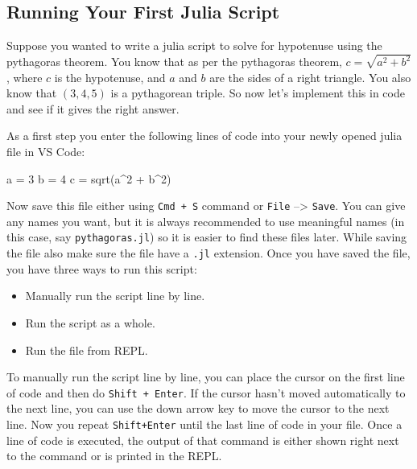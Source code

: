 \documentclass[
  letterpaper,
]{book}
\newenvironment{Shaded}{\begin{snugshade}}{\end{snugshade}}
\newcommand{\FloatTok}[1]{\textcolor[rgb]{0.68,0.00,0.00}{#1}}
\newcommand{\FunctionTok}[1]{\textcolor[rgb]{0.28,0.35,0.67}{#1}}
\newcommand{\NormalTok}[1]{\textcolor[rgb]{0.00,0.23,0.31}{#1}}
\newcommand{\OperatorTok}[1]{\textcolor[rgb]{0.37,0.37,0.37}{#1}}
\providecommand{\tightlist}{%
  \setlength{\itemsep}{0pt}\setlength{\parskip}{0pt}}\usepackage{longtable,booktabs,array}
\begin{document}
\hypertarget{sec-julia-script}{%
\subsection{Running Your First Julia Script}\label{sec-julia-script}}

Suppose you wanted to write a julia script to solve for hypotenuse using
the pythagoras theorem. You know that as per the pythagoras theorem,
\(c = \sqrt{a^2 + b^2}\), where \(c\) is the hypotenuse, and \(a\) and
\(b\) are the sides of a right triangle. You also know that \((3,4,5)\)
is a pythagorean triple. So now let's implement this in code and see if
it gives the right answer.

As a first step you enter the following lines of code into your newly
opened julia file in VS Code:

\begin{Shaded}
\begin{Highlighting}[]
\NormalTok{a }\OperatorTok{=} \FloatTok{3}
\NormalTok{b }\OperatorTok{=} \FloatTok{4}
\NormalTok{c }\OperatorTok{=} \FunctionTok{sqrt}\NormalTok{(a}\OperatorTok{\^{}}\FloatTok{2} \OperatorTok{+}\NormalTok{ b}\OperatorTok{\^{}}\FloatTok{2}\NormalTok{)}
\end{Highlighting}
\end{Shaded}

Now save this file either using \texttt{Cmd\ +\ S} command or
\texttt{File} --\textgreater{} \texttt{Save}. You can give any names you
want, but it is always recommended to use meaningful names (in this
case, say \texttt{pythagoras.jl}) so it is easier to find these files
later. While saving the file also make sure the file have a \texttt{.jl}
extension. Once you have saved the file, you have three ways to run this
script:

\begin{itemize}
\tightlist
\item
  Manually run the script line by line.
\item
  Run the script as a whole.
\item
  Run the file from REPL.
\end{itemize}

To manually run the script line by line, you can place the cursor on the
first line of code and then do \texttt{Shift\ +\ Enter}. If the cursor
hasn't moved automatically to the next line, you can use the down arrow
key to move the cursor to the next line. Now you repeat
\texttt{Shift+Enter} until the last line of code in your file. Once a
line of code is executed, the output of that command is either shown
right next to the command or is printed in the REPL.
\end{document}
